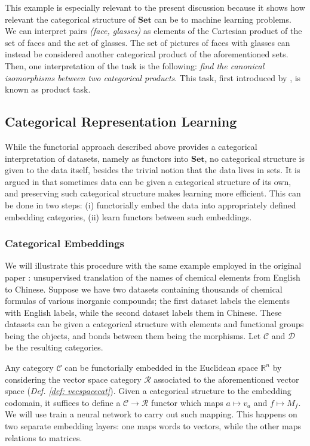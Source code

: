 \documentclass[12pt,a4paper,openright,twoside]{report}
\theoremstyle{plain}
\theoremstyle{definition}
\begin{document}
This example is especially relevant to the present discussion because it shows how relevant the categorical structure of $\mathbf{Set}$ can be to machine learning problems. We can interpret pairs \textit{(face, glasses)} as elements of the Cartesian product of the set of faces and the set of glasses. The set of pictures of faces with glasses can instead be considered another categorical product of the aforementioned sets. Then, one interpretation of the task is the following: \textit{find the canonical isomorphisms between two categorical products}. This task, first introduced by \cite{gavranovic2019compositional}, is known as product task.





\subsection{Categorical Representation Learning}


While the functorial approach described above provides a categorical interpretation of datasets, namely as functors into $\mathbf{Set}$, no categorical structure is given to the data itself, besides the trivial notion that the data lives in sets. It is argued in \cite{sheshmani2021categorical} that sometimes data can be given a categorical structure of its own, and preserving such categorical structure makes learning more efficient. This can be done in two steps: (i) functorially embed the data into appropriately defined embedding categories, (ii) learn functors between such embeddings. 


\subsubsection{Categorical Embeddings}

We will illustrate this procedure with the same example employed in the original paper \cite{sheshmani2021categorical}: unsupervised translation of the names of chemical elements from English to Chinese. Suppose we have two datasets containing thousands of chemical formulas of various inorganic compounds; the first dataset labels the elements with English labels, while the second dataset labels them in Chinese. These datasets can be given a categorical structure with elements and functional groups being the objects, and bonds between them being the morphisms. Let $\mathcal{C}$ and $\mathcal{D}$ be the resulting categories.


Any category $\mathcal{C}$ can be functorially embedded in the Euclidean space $\mathbb{R}^n$ by considering the vector space category $\mathcal{R}$ associated to the aforementioned vector space (\textit{Def. \ref{def: vecspacecat}}). Given a categorical structure to the embedding codomain, it suffices to define a $\mathcal{C} \to \mathcal{R}$ functor which maps $a \mapsto v_a$ and $f \mapsto M_f$. We will use train a neural network to carry out such mapping. This happens on two separate embedding layers: one maps words to vectors, while the other maps relations to matrices.  
\end{document}
